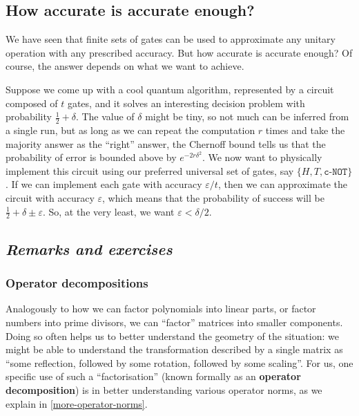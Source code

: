 \documentclass[fleqn]{article}
\renewcommand{\footnote}[1]{\en{#1}}
\begin{document}
\hypertarget{how-accurate-is-accurate-enough}{%
\subsection{How accurate is accurate enough?}\label{how-accurate-is-accurate-enough}}

We have seen that finite sets of gates can be used to approximate any unitary operation with any prescribed accuracy.
But how accurate is accurate enough?
Of course, the answer depends on what we want to achieve.

Suppose we come up with a cool quantum algorithm, represented by a circuit composed of \(t\) gates, and it solves an interesting decision problem with probability \(\frac{1}{2}+\delta\).
The value of \(\delta\) might be tiny, so not much can be inferred from a single run, but as long as we can repeat the computation \(r\) times and take the majority answer as the ``right'' answer, the Chernoff bound\footnote{Recall Exercise \ref{imperfect-decision-maker}.} tells us that the probability of error is bounded above by \(e^{-2r\delta^2}\).
We now want to physically implement this circuit using our preferred universal set of gates, say \(\{H,T,\texttt{c-NOT}\}\).
If we can implement each gate with accuracy \(\varepsilon/t\), then we can approximate the circuit with accuracy \(\varepsilon\), which means that the probability of success will be \(\frac{1}{2}+\delta\pm\varepsilon\).
So, at the very least, we want \(\varepsilon<\delta/2\).

\hypertarget{remarks-and-exercises-approximations}{%
\subsection{\texorpdfstring{\emph{Remarks and exercises}}{Remarks and exercises}}\label{remarks-and-exercises-approximations}}

\hypertarget{operator-decompositions}{%
\subsubsection{Operator decompositions}\label{operator-decompositions}}

Analogously to how we can factor polynomials into linear parts, or factor numbers into prime divisors, we can ``factor'' matrices into smaller components.
Doing so often helps us to better understand the geometry of the situation: we might be able to understand the transformation described by a single matrix as ``some reflection, followed by some rotation, followed by some scaling''.
For us, one specific use of such a ``factorisation'' (known formally as an \textbf{operator decomposition}) is in better understanding various operator norms, as we explain in \ref{more-operator-norms}.
\end{document}
